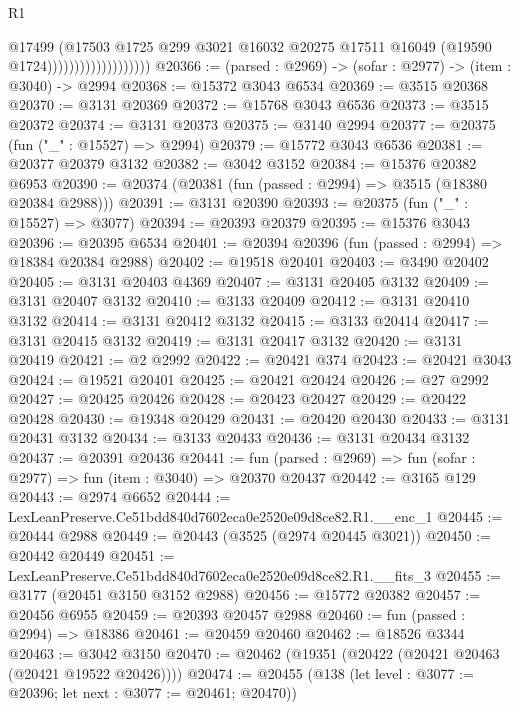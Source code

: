 \begin{lexlean}{R1}
\begin{coremodule}
                                      @17499
                                      (@17503
                                        @1725
                                        @299
                                        @3021
                                        @16032
                                        @20275
                                        @17511
                                        @16049
                                        (@19590 @1724)))))))))))))))))))
@20366 := (parsed : @2969) -> (sofar : @2977) -> (item : @3040) -> @2994
@20368 := @15372 @3043 @6534
@20369 := @3515 @20368
@20370 := @3131 @20369
@20372 := @15768 @3043 @6536
@20373 := @3515 @20372
@20374 := @3131 @20373
@20375 := @3140 @2994
@20377 := @20375 (fun ("_" : @15527) => @2994)
@20379 := @15772 @3043 @6536
@20381 := @20377 @20379 @3132
@20382 := @3042 @3152
@20384 := @15376 @20382 @6953
@20390 := @20374 (@20381 (fun (passed : @2994) => @3515 (@18380 @20384 @2988)))
@20391 := @3131 @20390
@20393 := @20375 (fun ("_" : @15527) => @3077)
@20394 := @20393 @20379
@20395 := @15376 @3043
@20396 := @20395 @6534
@20401 := @20394 @20396 (fun (passed : @2994) => @18384 @20384 @2988)
@20402 := @19518 @20401
@20403 := @3490 @20402
@20405 := @3131 @20403 @4369
@20407 := @3131 @20405 @3132
@20409 := @3131 @20407 @3132
@20410 := @3133 @20409
@20412 := @3131 @20410 @3132
@20414 := @3131 @20412 @3132
@20415 := @3133 @20414
@20417 := @3131 @20415 @3132
@20419 := @3131 @20417 @3132
@20420 := @3131 @20419
@20421 := @2 @2992
@20422 := @20421 @374
@20423 := @20421 @3043
@20424 := @19521 @20401
@20425 := @20421 @20424
@20426 := @27 @2992
@20427 := @20425 @20426
@20428 := @20423 @20427
@20429 := @20422 @20428
@20430 := @19348 @20429
@20431 := @20420 @20430
@20433 := @3131 @20431 @3132
@20434 := @3133 @20433
@20436 := @3131 @20434 @3132
@20437 := @20391 @20436
@20441 := fun (parsed : @2969) => fun (sofar : @2977) => fun (item : @3040) => @20370 @20437
@20442 := @3165 @129
@20443 := @2974 @6652
@20444 := LexLeanPreserve.Ce51bdd840d7602eca0e2520e09d8ce82.R1.__enc_1
@20445 := @20444 @2988
@20449 := @20443 (@3525 (@2974 @20445 @3021))
@20450 := @20442 @20449
@20451 := LexLeanPreserve.Ce51bdd840d7602eca0e2520e09d8ce82.R1.__fits_3
@20455 := @3177 (@20451 @3150 @3152 @2988)
@20456 := @15772 @20382
@20457 := @20456 @6955
@20459 := @20393 @20457 @2988
@20460 := fun (passed : @2994) => @18386
@20461 := @20459 @20460
@20462 := @18526 @3344
@20463 := @3042 @3150
@20470 := @20462 (@19351 (@20422 (@20421 @20463 (@20421 @19522 @20426))))
@20474 := @20455 (@138 (let level : @3077 := @20396; let next : @3077 := @20461; @20470))

\end{coremodule}
\end{lexlean}
